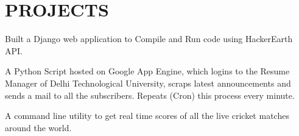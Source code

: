 \documentclass[]{deedy-resume-openfont}
\begin{document}
\begin{minipage}[t]{0.66\textwidth}


\section{PROJECTS}
Built a Django web application to Compile and Run code using HackerEarth API.
\sectionsep

A Python Script hosted on Google App Engine, which logins to the Resume Manager of Delhi Technological University, scraps latest announcements and sends a mail to all the subscribers. Repeats (Cron) this process every minute.
\sectionsep

A command line utility to get real time scores of all the live cricket matches around the world.

\sectionsep




\sectionsep


\end{minipage}
\end{document}
